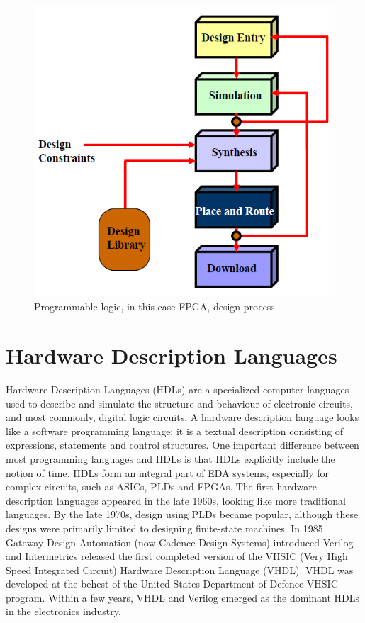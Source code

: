 \begin{figure}[H]
	\centering
	\includegraphics[width=0.4\linewidth]{IMG/ch3/FLOW}
	\caption{Programmable logic, in this case FPGA, design process}
	\label{fig:flow}
\end{figure}

\section{Hardware Description Languages}
\noindent Hardware Description Languages (HDLs) are a specialized computer languages used to describe and simulate the structure and behaviour of electronic circuits, and most commonly, digital logic circuits\cite{hdl}. A hardware description language looks like a software programming language; it is a textual description consisting of expressions, statements and control structures. One important difference between most programming languages and HDLs is that HDLs explicitly include the notion of time.
HDLs form an integral part of EDA systems, especially for complex circuits, such as ASICs, PLDs and FPGAs.
\newline
The first hardware description languages appeared in the late 1960s, looking like more traditional languages.
By the late 1970s, design using PLDs became popular, although these designs were primarily limited to designing finite-state machines.
In 1985 Gateway Design Automation (now Cadence Design Systems) introduced Verilog and Intermetrics released the first completed version of the VHSIC (Very High Speed Integrated Circuit) Hardware Description Language (VHDL).
VHDL was developed at the behest of the United States Department of Defence VHSIC program.
Within a few years, VHDL and Verilog emerged as the dominant HDLs in the electronics industry.
